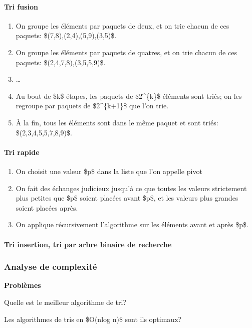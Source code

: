 \paragraph{Tri fusion}

\begin{enumerate}
\item
  On groupe les éléments par paquets de deux, et on trie chacun de ces
  paquets: \$(7,8),(2,4),(5,9),(3,5)\$.
\item
  On groupe les éléments par paquets de quatres, et on trie chacun de
  ces paquets: \$(2,4,7,8),(3,5,5,9)\$.
\item
  \ldots{}
\item
  Au bout de \$k\$ étapes, les paquets de \$2\^{}\{k\}\$ éléments sont
  triés; on les regroupe par paquets de \$2\^{}\{k+1\}\$ que l'on trie.
\item
  À la fin, tous les éléments sont dans le même paquet et sont triés:
  \$(2,3,4,5,5,7,8,9)\$.
\end{enumerate}

\paragraph{Tri rapide}

\begin{enumerate}
\item
  On choisit une valeur \$p\$ dans la liste que l'on appelle pivot
\item
  On fait des échanges judicieux jusqu'à ce que toutes les valeurs
  strictement plus petites que \$p\$ soient placées avant \$p\$, et les
  valeurs plus grandes soient placées après.
\item
  On applique récursivement l'algorithme sur les éléments avant et après
  \$p\$.
\end{enumerate}

\paragraph{Tri insertion, tri par arbre binaire de recherche}

\subsubsection{Analyse de complexité}

\textbf{Problèmes}

Quelle est le meilleur algorithme de tri?

Les algorithmes de tris en \$O(nlog n)\$ sont ils optimaux?

